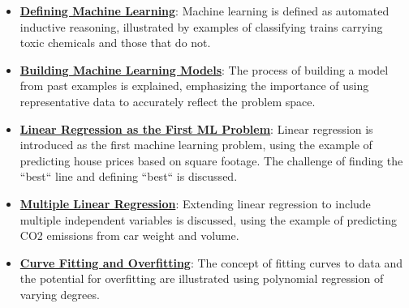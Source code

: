 \documentclass{article}%
\begin{document}
\begin{itemize}[leftmargin=*]
\item \href{https://purdue.brightspace.com/d2l/common/assets/pdfjs-d2l-dist/1.0.14-legacy/web/viewer.html?file=\%2Fcontent\%2Fenforced\%2F1095467-wl.202510.CS.24300.001\%2F05L2-ML Basics.pdf\%3Fou\%3D1095467\&lang=en-us\&container=d2l-fileviewer-rendered-pdf\&fullscreen=d2l-fileviewer-rendered-pdf-dialog\&height=667#page=3}{\textbf{Defining Machine Learning}}: Machine learning is defined as automated inductive reasoning, illustrated by examples of classifying trains carrying toxic chemicals and those that do not.%
\item \href{https://purdue.brightspace.com/d2l/common/assets/pdfjs-d2l-dist/1.0.14-legacy/web/viewer.html?file=\%2Fcontent\%2Fenforced\%2F1095467-wl.202510.CS.24300.001\%2F05L2-ML Basics.pdf\%3Fou\%3D1095467\&lang=en-us\&container=d2l-fileviewer-rendered-pdf\&fullscreen=d2l-fileviewer-rendered-pdf-dialog\&height=667#page=5}{\textbf{Building Machine Learning Models}}: The process of building a model from past examples is explained, emphasizing the importance of using representative data to accurately reflect the problem space.%
\item \href{https://purdue.brightspace.com/d2l/common/assets/pdfjs-d2l-dist/1.0.14-legacy/web/viewer.html?file=\%2Fcontent\%2Fenforced\%2F1095467-wl.202510.CS.24300.001\%2F05L2-ML Basics.pdf\%3Fou\%3D1095467\&lang=en-us\&container=d2l-fileviewer-rendered-pdf\&fullscreen=d2l-fileviewer-rendered-pdf-dialog\&height=667#page=6}{\textbf{Linear Regression as the First ML Problem}}: Linear regression is introduced as the first machine learning problem, using the example of predicting house prices based on square footage. The challenge of finding the ``best`` line and defining ``best`` is discussed.%
\item \href{https://purdue.brightspace.com/d2l/common/assets/pdfjs-d2l-dist/1.0.14-legacy/web/viewer.html?file=\%2Fcontent\%2Fenforced\%2F1095467-wl.202510.CS.24300.001\%2F05L2-ML Basics.pdf\%3Fou\%3D1095467\&lang=en-us\&container=d2l-fileviewer-rendered-pdf\&fullscreen=d2l-fileviewer-rendered-pdf-dialog\&height=667#page=11}{\textbf{Multiple Linear Regression}}: Extending linear regression to include multiple independent variables is discussed, using the example of predicting CO2 emissions from car weight and volume.%
\item \href{https://purdue.brightspace.com/d2l/common/assets/pdfjs-d2l-dist/1.0.14-legacy/web/viewer.html?file=\%2Fcontent\%2Fenforced\%2F1095467-wl.202510.CS.24300.001\%2F05L2-ML Basics.pdf\%3Fou\%3D1095467\&lang=en-us\&container=d2l-fileviewer-rendered-pdf\&fullscreen=d2l-fileviewer-rendered-pdf-dialog\&height=667#page=13}{\textbf{Curve Fitting and Overfitting}}: The concept of fitting curves to data and the potential for overfitting are illustrated using polynomial regression of varying degrees.%

\end{itemize}
\end{document}
